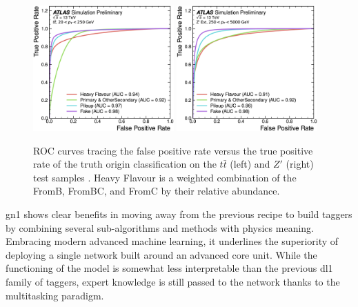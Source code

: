 \begin{figure}[h!]
  \centering
  \includegraphics[width=0.48\textwidth]{Images/FTAG/GN/GN1/ablations/ttroc.png}
  \includegraphics[width=0.48\textwidth]{Images/FTAG/GN/GN1/ablations/zproc.png}
  \caption{ROC curves tracing the false positive rate versus the true positive rate of the truth origin classification on the $t\bar{t}$ (left) and $Z'$ (right) test samples \cite{ATL-PHYS-PUB-2022-027}. Heavy Flavour is a weighted combination of the FromB, FromBC, and FromC by their relative abundance.}
  \label{fig:GN1trackperf}
\end{figure} 

\gls{gn1} shows clear benefits in moving away from the previous recipe to build taggers by combining several sub-algorithms and methods with physics meaning. Embracing modern advanced machine learning, it underlines the superiority of deploying a single network built around an advanced core unit. While the functioning of the model is somewhat less interpretable than the previous \gls{dl1} family of taggers, expert knowledge is still passed to the network thanks to the multitasking paradigm. %

